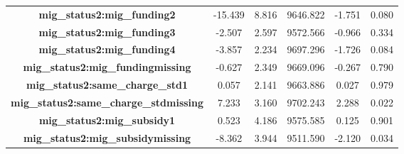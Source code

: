\documentclass[
  man,
  floatsintext,
  longtable,
  nolmodern,
  notxfonts,
  notimes,
  colorlinks=true,linkcolor=blue,citecolor=blue,urlcolor=blue]{apa7}
\begin{document}
\begin{table}
\begin{longtable*}[t]{>{}cccccc}
\textbf{mig\_status2:mig\_funding2} & -15.439 & 8.816 & 9646.822 & -1.751 & 0.080\\
\textbf{mig\_status2:mig\_funding3} & -2.507 & 2.597 & 9572.566 & -0.966 & 0.334\\
\addlinespace
\textbf{mig\_status2:mig\_funding4} & -3.857 & 2.234 & 9697.296 & -1.726 & 0.084\\
\textbf{mig\_status2:mig\_fundingmissing} & -0.627 & 2.349 & 9669.096 & -0.267 & 0.790\\
\textbf{mig\_status2:same\_charge\_std1} & 0.057 & 2.141 & 9663.886 & 0.027 & 0.979\\
\textbf{mig\_status2:same\_charge\_stdmissing} & 7.233 & 3.160 & 9702.243 & 2.288 & 0.022\\
\textbf{mig\_status2:mig\_subsidy1} & 0.523 & 4.186 & 9575.585 & 0.125 & 0.901\\
\addlinespace
\textbf{mig\_status2:mig\_subsidymissing} & -8.362 & 3.944 & 9511.590 & -2.120 & 0.034\\
\bottomrule
\end{longtable*}
\endgroup{}

\end{table}
\end{document}
